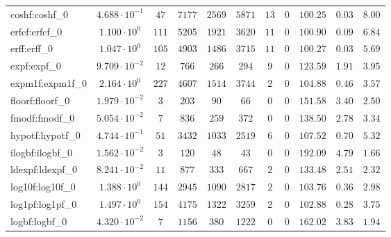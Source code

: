 \begin{tabular}{|l|c|c|c|c|c|c|c|c|c|c|}
coshf:coshf\_0               & $ 4.688 \cdot 10^{-1} $ & $ 47     $ & $ 7177   $ & $ 2569  $ & $ 5871  $ & $ 13  $ & $ 0 $ & $ 100.25      $ & $ 0.03    $ & $ 8.00    $ \\
erfcf:erfcf\_0               & $ 1.100 \cdot 10^{0}  $ & $ 111    $ & $ 5205   $ & $ 1921  $ & $ 3620  $ & $ 11  $ & $ 0 $ & $ 100.90      $ & $ 0.09    $ & $ 6.84    $ \\
erff:erff\_0                 & $ 1.047 \cdot 10^{0}  $ & $ 105    $ & $ 4903   $ & $ 1486  $ & $ 3715  $ & $ 11  $ & $ 0 $ & $ 100.27      $ & $ 0.03    $ & $ 5.69    $ \\
expf:expf\_0                 & $ 9.709 \cdot 10^{-2} $ & $ 12     $ & $ 766    $ & $ 266   $ & $ 294   $ & $ 9   $ & $ 0 $ & $ 123.59      $ & $ 1.91    $ & $ 3.95    $ \\
expm1f:expm1f\_0             & $ 2.164 \cdot 10^{0}  $ & $ 227    $ & $ 4607   $ & $ 1514  $ & $ 3744  $ & $ 2   $ & $ 0 $ & $ 104.88      $ & $ 0.46    $ & $ 3.57    $ \\
floorf:floorf\_0             & $ 1.979 \cdot 10^{-2} $ & $ 3      $ & $ 203    $ & $ 90    $ & $ 66    $ & $ 0   $ & $ 0 $ & $ 151.58      $ & $ 3.40    $ & $ 2.50    $ \\
fmodf:fmodf\_0               & $ 5.054 \cdot 10^{-2} $ & $ 7      $ & $ 836    $ & $ 259   $ & $ 372   $ & $ 0   $ & $ 0 $ & $ 138.50      $ & $ 2.78    $ & $ 3.34    $ \\
hypotf:hypotf\_0             & $ 4.744 \cdot 10^{-1} $ & $ 51     $ & $ 3432   $ & $ 1033  $ & $ 2519  $ & $ 6   $ & $ 0 $ & $ 107.52      $ & $ 0.70    $ & $ 5.32    $ \\
ilogbf:ilogbf\_0             & $ 1.562 \cdot 10^{-2} $ & $ 3      $ & $ 120    $ & $ 48    $ & $ 43    $ & $ 0   $ & $ 0 $ & $ 192.09      $ & $ 4.79    $ & $ 1.66    $ \\
ldexpf:ldexpf\_0             & $ 8.241 \cdot 10^{-2} $ & $ 11     $ & $ 877    $ & $ 333   $ & $ 667   $ & $ 2   $ & $ 0 $ & $ 133.48      $ & $ 2.51    $ & $ 2.32    $ \\
log10f:log10f\_0             & $ 1.388 \cdot 10^{0}  $ & $ 144    $ & $ 2945   $ & $ 1090  $ & $ 2817  $ & $ 2   $ & $ 0 $ & $ 103.76      $ & $ 0.36    $ & $ 2.98    $ \\
log1pf:log1pf\_0             & $ 1.497 \cdot 10^{0}  $ & $ 154    $ & $ 4175   $ & $ 1322  $ & $ 3259  $ & $ 2   $ & $ 0 $ & $ 102.88      $ & $ 0.28    $ & $ 3.75    $ \\
logbf:logbf\_0               & $ 4.320 \cdot 10^{-2} $ & $ 7      $ & $ 1156   $ & $ 380   $ & $ 1222  $ & $ 0   $ & $ 0 $ & $ 162.02      $ & $ 3.83    $ & $ 1.94    $ \\

\end{tabular}
